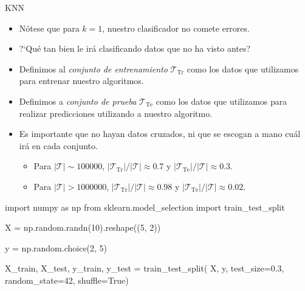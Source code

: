\documentclass[usenames,dvipsnames]{beamer} %
\newcommand\defi[1]{\textcolor{NavyBlue}{\textit{#1}}}
\begin{document}
\begin{frame}{KNN}
\begin{itemize}
	\item N\'otese que para $k=1$, nuestro clasificador no comete errores.
	\item ?`Qu\'e tan bien le ir\'a clasificando datos que no ha visto antes?
	\item Definimos al \defi{conjunto de entrenamiento} $\mathcal{T}_{\text{Tr}}$ como los datos que utilizamos para entrenar nuestro algoritmos.
	\item Definimos a \defi{conjunto de prueba} $\mathcal{T}_{\text{Te}}$ como los datos que utilizamos para realizar predicciones utilizando a nuestro algoritmo.
	\item Es importante que no hayan datos cruzados, ni que se escogan a mano cu\'al ir\'a en cada conjunto.
	\begin{itemize}
		\item Para $\lvert\mathcal{T}\rvert \sim 100000$, $\lvert \mathcal{T}_{\text{Tr}} \rvert / \lvert \mathcal{T} \rvert \approx 0.7 $ y $\lvert \mathcal{T}_{\text{Te}} \rvert / \lvert \mathcal{T} \rvert \approx 0.3 $.
		\item Para $\lvert\mathcal{T}\rvert > 1000000$, $\lvert \mathcal{T}_{\text{Tr}} \rvert / \lvert \mathcal{T} \rvert \approx 0.98 $ y $\lvert \mathcal{T}_{\text{Te}} \rvert / \lvert \mathcal{T} \rvert \approx 0.02 $.
	\end{itemize}
\end{itemize}
\end{frame}

\begin{frame}[fragile]
\begin{semiverbatim}
\textcolor{deepblue}{import} numpy as np
\textcolor{deepblue}{from} sklearn.model\_selection \textcolor{deepblue}{import} train\_test\_split

X = np.random.randn(10).reshape((5, 2))

y = np.random.choice(2, 5)

X\_train, X\_test, y\_train, y\_test = train\_test\_split(
X, y, test\_size=0.3, random\_state=42, shuffle=True)
\end{semiverbatim}
\end{frame}
\end{document}
